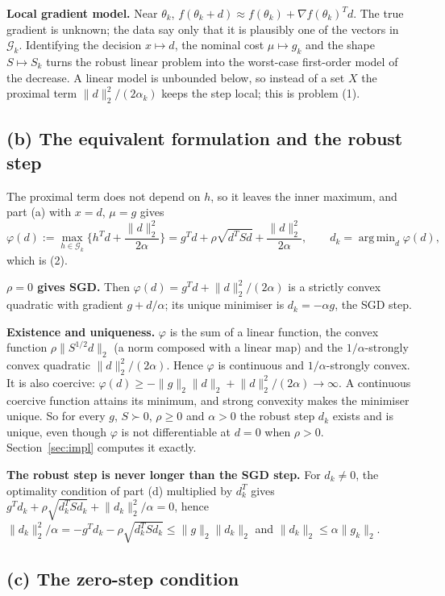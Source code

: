 \documentclass[11pt,a4paper]{article}
\newcommand{\G}{\mathcal{G}_k}
\newcommand{\norm}[1]{\lVert #1\rVert_2}
\DeclareMathOperator*{\argmin}{arg\,min}
\begin{document}
\textbf{Local gradient model.} Near $\theta_k$,
$f(\theta_k+d)\approx f(\theta_k)+\nabla f(\theta_k)^Td$. The true gradient is unknown; the
data say only that it is plausibly one of the vectors in $\G$. Identifying the decision
$x\mapsto d$, the nominal cost $\mu\mapsto g_k$ and the shape $S\mapsto S_k$ turns the robust
linear problem into the worst-case first-order model of the decrease. A linear model is
unbounded below, so instead of a set $X$ the proximal term $\norm d^2/(2\alpha_k)$ keeps the
step local; this is problem (1).

\subsection{(b) The equivalent formulation and the robust step}

The proximal term does not depend on $h$, so it leaves the inner maximum, and part (a) with
$x=d$, $\mu=g$ gives
\begin{equation*}
\varphi(d):=\max_{h\in\G}\Big\{h^Td+\frac{\norm d^2}{2\alpha}\Big\}
=g^Td+\rho\sqrt{d^TSd}+\frac{\norm d^2}{2\alpha},\qquad d_k=\argmin_d\varphi(d),
\end{equation*}
which is (2).

\textbf{$\rho=0$ gives SGD.} Then $\varphi(d)=g^Td+\norm d^2/(2\alpha)$ is a strictly convex
quadratic with gradient $g+d/\alpha$; its unique minimiser is $d_k=-\alpha g$, the SGD step.

\textbf{Existence and uniqueness.} $\varphi$ is the sum of a linear function, the convex
function $\rho\norm{S^{1/2}d}$ (a norm composed with a linear map) and the
$1/\alpha$-strongly convex quadratic $\norm d^2/(2\alpha)$. Hence $\varphi$ is continuous and
$1/\alpha$-strongly convex. It is also coercive:
$\varphi(d)\ge-\norm g\norm d+\norm d^2/(2\alpha)\to\infty$. A continuous coercive function
attains its minimum, and strong convexity makes the minimiser unique. So for every $g$,
$S\succ0$, $\rho\ge0$ and $\alpha>0$ the robust step $d_k$ exists and is unique, even though
$\varphi$ is not differentiable at $d=0$ when $\rho>0$. Section~\ref{sec:impl} computes it
exactly.

\textbf{The robust step is never longer than the SGD step.} For $d_k\ne0$, the optimality
condition of part (d) multiplied by $d_k^T$ gives
$g^Td_k+\rho\sqrt{d_k^TSd_k}+\norm{d_k}^2/\alpha=0$, hence
$\norm{d_k}^2/\alpha=-g^Td_k-\rho\sqrt{d_k^TSd_k}\le\norm g\norm{d_k}$ and
$\norm{d_k}\le\alpha\norm{g_k}$.

\subsection{(c) The zero-step condition}
\end{document}
